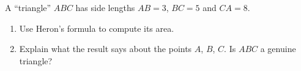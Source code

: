 A ``triangle'' $ABC$ has side lengths $AB=3$, $BC=5$ and $CA=8$.
\begin{enumerate}
\item[(a)] Use Heron's formula to compute its area.
\item[(b)] Explain what the result says about the points $A$, $B$, $C$. Is $ABC$ a genuine triangle?
\end{enumerate}
